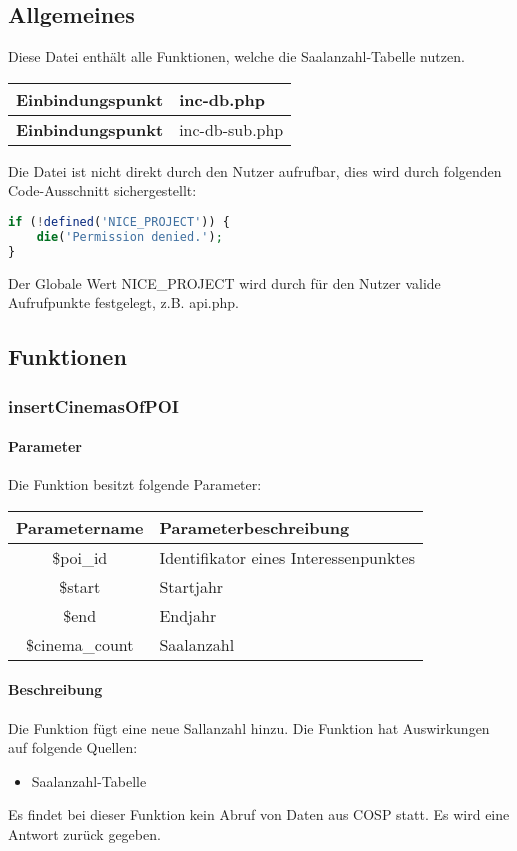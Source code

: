 \subsection{Allgemeines} Diese Datei enthält alle Funktionen, welche die Saalanzahl-Tabelle nutzen.
\begin{table}[H]
	\begin{tabular}{|c|p{11cm}|}
		\hline
		\textbf{Einbindungspunkt} & inc-db.php \\ \hline
		\textbf{Einbindungspunkt} & inc-db-sub.php \\ \hline
	\end{tabular}
\end{table}
Die Datei ist nicht direkt durch den Nutzer aufrufbar, dies wird durch folgenden Code-Ausschnitt sichergestellt:
\begin{lstlisting}[language=php]
if (!defined('NICE_PROJECT')) {
	die('Permission denied.');
}
\end{lstlisting}
Der Globale Wert {\glqq NICE\_PROJECT\grqq} wird durch für den Nutzer valide Aufrufpunkte festgelegt, z.B. {\glqq api.php\grqq}.
\newpage
\subsection{Funktionen}
\subsubsection{insertCinemasOfPOI}
\paragraph{Parameter} Die Funktion besitzt folgende Parameter:
\begin{table}[H]
	\begin{tabular}{|c|p{11cm}|}
		\hline
		\textbf{Parametername} & \textbf{Parameterbeschreibung} \\ \hline
		\$poi\_id       & Identifikator eines Interessenpunktes \\ \hline
		\$start         & Startjahr \\ \hline
		\$end           & Endjahr \\ \hline
		\$cinema\_count & Saalanzahl \\ \hline
	\end{tabular}
\end{table}
\paragraph{Beschreibung} Die Funktion fügt eine neue Sallanzahl hinzu. Die Funktion hat Auswirkungen auf folgende Quellen:
\begin{itemize}
	\item Saalanzahl-Tabelle
\end{itemize}
Es findet bei dieser Funktion kein Abruf von Daten aus {\glqq COSP\grqq} statt. Es wird eine Antwort zurück gegeben.
